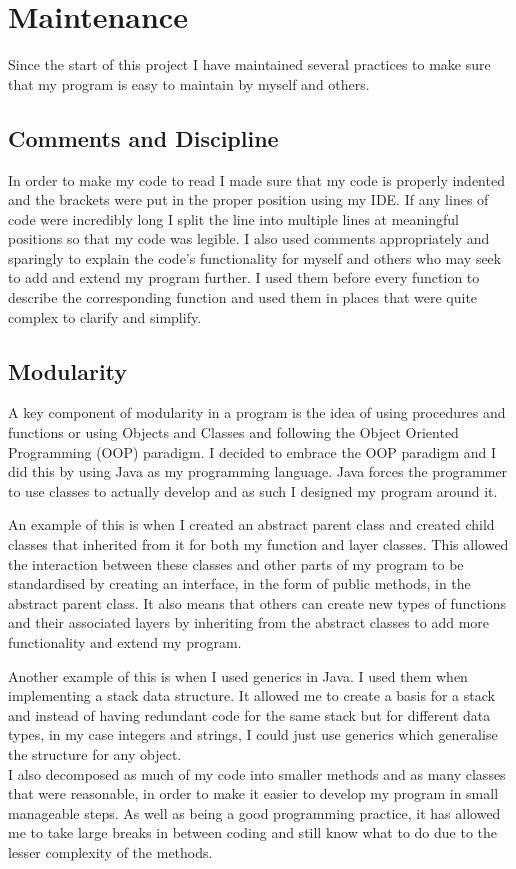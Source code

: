 \documentclass[../../../main.tex]{subfiles}
\begin{document}
\section{Maintenance}%
Since the start of this project I have maintained several practices to make sure that my program is easy to maintain by myself and others.
\subsection{Comments and Discipline}
In order to make my code to read I made sure that my code is properly indented and the brackets were put in the proper position using my IDE. If any lines of code were incredibly long I split the line into multiple lines at meaningful positions so that my code was legible. I also used comments appropriately and sparingly to explain the code's functionality for myself and others who may seek to add and extend my program further. I used them before every function to describe the corresponding function and used them in places that were quite complex to clarify and simplify.

\subsection{Modularity}
A key component of modularity in a program is the idea of using procedures and functions or using Objects and Classes and following the Object Oriented Programming (OOP) paradigm. I decided to embrace the OOP paradigm and I did this by using Java as my programming language. Java forces the programmer to use classes to actually develop and as such I designed my program around it.

An example of this is when I created an abstract parent class and created child classes that inherited from it for both my function and layer classes. This allowed the interaction between these classes and other parts of my program to be standardised by creating an interface, in the form of public methods, in the abstract parent class. It also means that others can create new types of functions and their associated layers by inheriting from the abstract classes to add more functionality and extend my program.

Another example of this is when I used generics in Java. I used them when implementing a stack data structure. It allowed me to create a basis for a stack and instead of having redundant code for the same stack but for different data types, in my case integers and strings, I could just use generics which generalise the structure for any object.\\
I also decomposed as much of my code into smaller methods and as many classes that were reasonable, in order to make it easier to develop my program in small manageable steps. As well as being a good programming practice, it has allowed me to take large breaks in between coding and still know what to do due to the lesser complexity of the methods.\\
\end{document}
